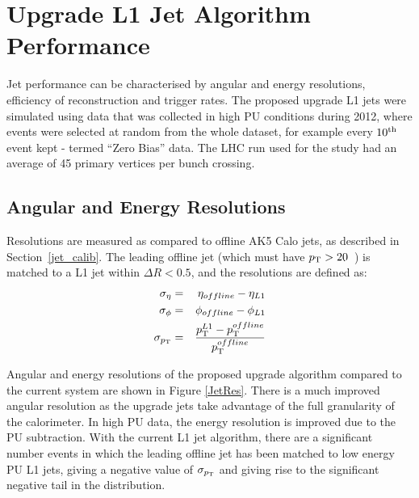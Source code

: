 \section{Upgrade L1 Jet Algorithm Performance}
Jet performance can be characterised by angular and energy resolutions, efficiency of reconstruction and trigger rates. The proposed upgrade \ac{L1} jets were simulated using data that was collected in high \ac{PU} conditions during 2012, where events were selected at random from the whole dataset, for example every $10^{\rm th}$ event kept - termed ``Zero Bias'' data. 
The \ac{LHC} run used for the study had an average of 45 primary vertices per bunch crossing.  

\subsection{Angular and Energy Resolutions}

Resolutions are measured as compared to offline AK5 Calo jets, as described in Section~\ref{jet_calib}. 
The leading offline jet (which must have $p_{\text{T}} > 20$~\GeV) is matched to a L1 jet within $\Delta R < 0.5$, and the resolutions are defined as:
\begin{eqnarray}
\sigma_{\eta} &=& \eta_{offline} - \eta_{L1} \\
\sigma_{\phi} &=& \phi_{offline} - \phi_{L1}\\
\sigma_{p_{\text{T}}} &=& \frac{ p_{\text{T}}^{L1} - p_{\text{T}}^{offline} } { p_{\text{T}}^{offline} } 
\end{eqnarray}  

Angular and energy resolutions of the proposed upgrade algorithm compared to the current system are shown in Figure \ref{JetRes}.
There is a much improved angular resolution as the upgrade jets take advantage of the full granularity of the calorimeter. In high PU data, the energy resolution is improved due to the PU subtraction. 
With the current \ac{L1} jet algorithm, there are a significant number events in which the leading offline jet has been matched to low energy PU L1 jets, giving a negative value of $\sigma_{p_{\text{T}}}$ and giving rise to the significant negative tail in the distribution.

